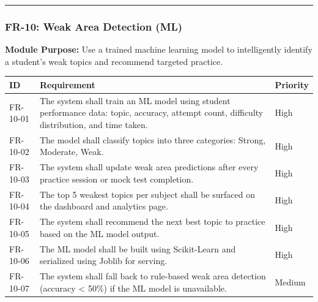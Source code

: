 \documentclass[
]{article}
\begin{document}
\begin{center}\rule{0.5\linewidth}{0.5pt}\end{center}

\subsubsection{FR-10: Weak Area Detection
(ML)}\label{fr-10-weak-area-detection-ml}

\textbf{Module Purpose:} Use a trained machine learning model to
intelligently identify a student's weak topics and recommend targeted
practice.

\begin{longtable}[]{@{}
  >{\raggedright\arraybackslash}p{}
  >{\raggedright\arraybackslash}p{}
  >{\raggedright\arraybackslash}p{}@{}}
\toprule\noalign{}
\begin{minipage}[b]{\linewidth}\raggedright
ID
\end{minipage} & \begin{minipage}[b]{\linewidth}\raggedright
Requirement
\end{minipage} & \begin{minipage}[b]{\linewidth}\raggedright
Priority
\end{minipage} \\
\midrule\noalign{}
\endhead
\bottomrule\noalign{}
\endlastfoot
FR-10-01 & The system shall train an ML model using student performance
data: topic, accuracy, attempt count, difficulty distribution, and time
taken. & High \\
FR-10-02 & The model shall classify topics into three categories:
Strong, Moderate, Weak. & High \\
FR-10-03 & The system shall update weak area predictions after every
practice session or mock test completion. & High \\
FR-10-04 & The top 5 weakest topics per subject shall be surfaced on the
dashboard and analytics page. & High \\
FR-10-05 & The system shall recommend the next best topic to practice
based on the ML model output. & High \\
FR-10-06 & The ML model shall be built using Scikit-Learn and serialized
using Joblib for serving. & High \\
FR-10-07 & The system shall fall back to rule-based weak area detection
(accuracy \textless{} 50\%) if the ML model is unavailable. & Medium \\
\end{longtable}
\end{document}
